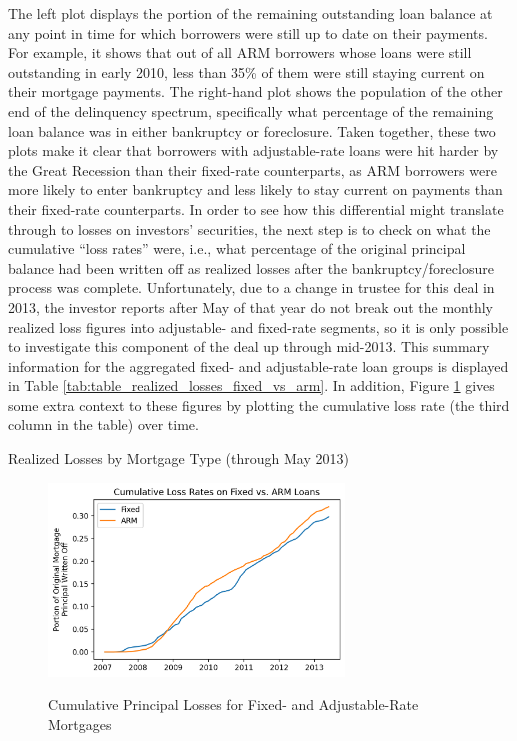 \documentclass[12pt]{article}
\begin{document}
The left plot displays the portion of the remaining outstanding loan balance at any point in time for which borrowers were still up to date on their payments. For example, it shows that out of all ARM borrowers whose loans were still outstanding in early 2010, less than 35\% of them were still staying current on their mortgage payments. The right-hand plot shows the population of the other end of the delinquency spectrum, specifically what percentage of the remaining loan balance was in either bankruptcy or foreclosure. Taken together, these two plots make it clear that borrowers with adjustable-rate loans were hit harder by the Great Recession than their fixed-rate counterparts, as ARM borrowers were more likely to enter bankruptcy and less likely to stay current on payments than their fixed-rate counterparts. In order to see how this differential might translate through to losses on investors’ securities, the next step is to check on what the cumulative “loss rates” were, i.e., what percentage of the original principal balance had been written off as realized losses after the bankruptcy/foreclosure process was complete. Unfortunately, due to a change in trustee for this deal in 2013, the investor reports after May of that year do not break out the monthly realized loss figures into adjustable- and fixed-rate segments, so it is only possible to investigate this component of the deal up through mid-2013. This summary information for the aggregated fixed- and adjustable-rate loan groups is displayed in Table \ref{tab:table_realized_losses_fixed_vs_arm}. In addition, Figure \ref{fig:timeseries_cumulative_losses_fixed_vs_arm} gives some extra context to these figures by plotting the cumulative loss rate (the third column in the table) over time.

\begin{table}[h]
	\centering
	
	\caption{Realized Losses by Mortgage Type (through May 2013)}
	\label{tab:table_realized_losses_fixed_vs_arm}
\end{table}

\begin{figure}[h]
	\centering
	\caption{Cumulative Principal Losses for Fixed- and Adjustable-Rate Mortgages}
	\includegraphics[width=0.7\textwidth]{../figures/timeseries_cumulative_losses_fixed_vs_arm}
	\label{fig:timeseries_cumulative_losses_fixed_vs_arm}
\end{figure}
\end{document}
